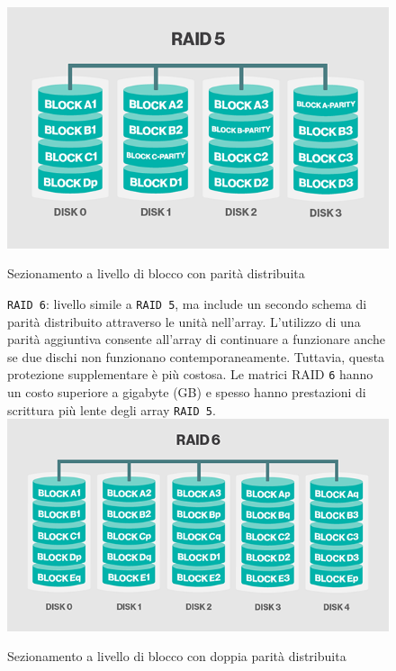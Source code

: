 \begin{itemize}
\begin{figure}[htbp]
\centering
\includegraphics[scale=0.40]{img/raid55.png}\\
\caption{Sezionamento a livello di blocco con parit\`{a} distribuita\label{figura1.9} \cite{etichetta9}}
\end{figure}

\begin{figure}[htbp]
\item
\verb"RAID 6": livello simile a \verb"RAID 5", ma include un secondo schema di parit\`{a} distribuito attraverso le unit\`{a} nell'array. L'utilizzo di una parit\`{a} aggiuntiva consente all'array di continuare a funzionare anche se due dischi non funzionano contemporaneamente. Tuttavia, questa protezione supplementare \`{e} pi\`{u} costosa. Le matrici RAID \verb"6" hanno un costo superiore a gigabyte (GB) e spesso hanno prestazioni di scrittura pi\`{u} lente degli array \verb"RAID 5".\cite{etichetta9}\\

\centering
\includegraphics[scale=0.40]{img/raid66.png}\\
\caption{Sezionamento a livello di blocco con doppia parit\`{a} distribuita\label{figura1.100} \cite{etichetta9}}
\end{figure}
\end{itemize}


